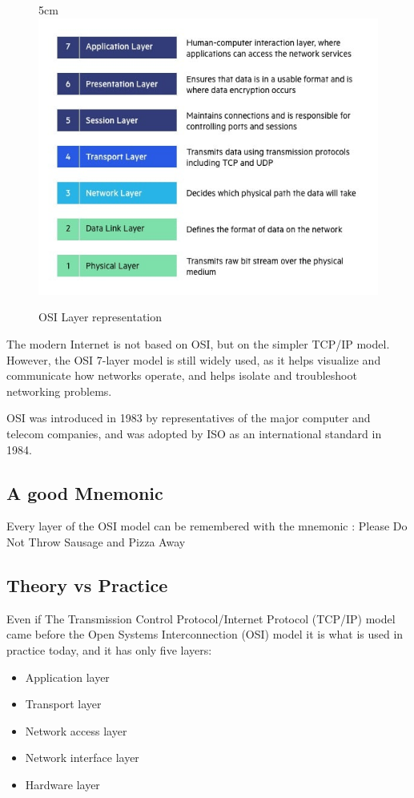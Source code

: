 \documentclass[a4paper,12pt]{article}
\begin{document}
\begin{figure}[21]{5cm}
\centering
\includegraphics[width=13cm]{./OSI-7-layers.jpg}
\caption{OSI Layer representation}\label{wrap-fig:3}
\end{figure}


The modern Internet is not based on OSI, but on the simpler TCP/IP model. However, the OSI 7-layer model is still widely used, as it helps visualize and communicate how networks operate, and helps isolate and troubleshoot networking problems.

OSI was introduced in 1983 by representatives of the major computer and telecom companies, and was adopted by ISO as an international standard in 1984.


\subsection{A good Mnemonic}
Every layer of the OSI model can be remembered with the mnemonic : Please Do Not Throw Sausage and Pizza Away

\subsection{Theory vs Practice}
Even if The Transmission Control Protocol/Internet Protocol (TCP/IP) model came before the Open Systems Interconnection (OSI) model it is what is used in practice today, and it has only five layers:

\begin{itemize}
\item {Application layer}
\item {Transport layer}
\item {Network access layer}
\item {Network interface layer}
\item {Hardware layer}
\end{itemize}
\end{document}
